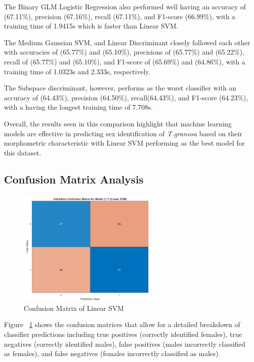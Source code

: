 The Binary GLM Logistic Regression also performed well having an accuracy of (67.11\%), precision (67.16\%), recall (67.11\%), and F1-score (66.99\%), with a training time of 1.9415s which is faster than Linear SVM. 

The Medium Gaussian SVM, and Linear Discriminant closely followed each other with accuracies of (65.77\%) and (65.10\%), precisions of (65.77\%) and (65.22\%), recall of (65.77\%) and (65.10\%), and F1-score of (65.69\%) and (64.86\%), with a training time of 1.0323s and 2.333s, respectively. 

The Subspace discriminant, however, performs as the worst classifier with an accuracy of (64.43\%), precision (64.50\%), recall(64.43\%), and F1-score (64.23\%), with a having the longest training time of 7.708s. 

Overall, the results seen in this comparison highlight that machine learning models are effective in predicting sex identification of \textit{T.granosa} based on their morphometric characteristic with Linear SVM performing as the best model for this dataset. 


\subsection{Confusion Matrix Analysis}
\begin{figure}[!htbp]
	\centering
	\includegraphics[width=0.6\textwidth]{figures/confusion-matrix.png}
	\caption{Confusion Matrix of Linear SVM}
	\label{fig:confusion-matrix}
\end{figure}

Figure ~\ref{fig:confusion-matrix} shows the confusion matrices that allow for a detailed breakdown of classifier predictions including true positives (correctly identified females), true negatives (correctly identified males), false positives (males incorrectly classified as females), and false negatives (females incorrectly classified as males).

